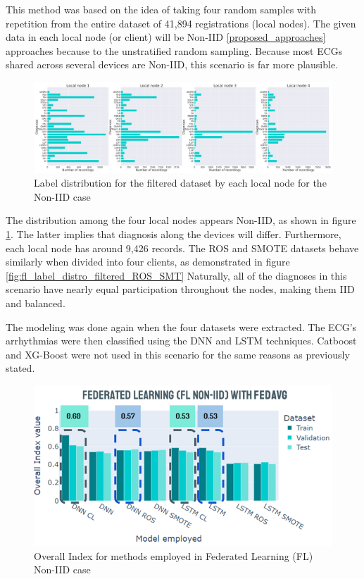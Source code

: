 This method was based on the idea of taking four random samples with repetition from the entire dataset of 41,894 registrations (local nodes). The given data in each local node (or client) will be Non-IID \ref{proposed_approaches} approaches because to the unstratified random sampling. Because most ECGs shared across several devices are Non-IID, this scenario is far more plausible.

\begin{figure}[H]
\centering
\includegraphics[scale=0.4]{img/fl_label_distro_filtered_noniid.png}
\caption{Label distribution for the filtered dataset by each local node for the Non-IID case}
\label{fig:fl_label_distro_filtered_noniid}
\end{figure}

The distribution among the four local nodes appears Non-IID, as shown in figure \ref{fig:fl_label_distro_filtered_noniid}. The latter implies that diagnosis along the devices will differ. Furthermore, each local node has around 9,426 records. The ROS and SMOTE datasets behave similarly when divided into four clients, as demonstrated in figure \ref{fig:fl_label_distro_filtered_ROS_SMT} Naturally, all of the diagnoses in this scenario have nearly equal participation throughout the nodes, making them IID and balanced.

The modeling was done again when the four datasets were extracted. The ECG's arrhythmias were then classified using the DNN and LSTM techniques. Catboost and XG-Boost were not used in this scenario for the same reasons as previously stated.

\begin{figure}[H]
\centering
\includegraphics[scale=0.6]{img/fl_noniid_methods.png}
\caption{Overall Index for methods employed in Federated Learning (FL) Non-IID case}
\label{fig:fl_noniid_methods}
\end{figure}

